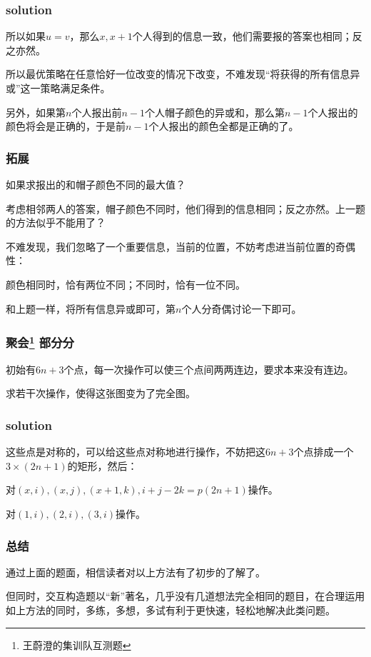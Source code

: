 \documentclass[10pt]{beamer}
\begin{document}
	\begin{frame}
		\frametitle{solution}	
		
		所以如果$u=v$，那么$x,x+1$个人得到的信息一致，他们需要报的答案也相同；反之亦然。

		所以最优策略在任意恰好一位改变的情况下改变，不难发现“将获得的所有信息异或”这一策略满足条件。

		另外，如果第$n$个人报出前$n-1$个人帽子颜色的异或和，那么第$n-1$个人报出的颜色将会是正确的，于是前$n-1$个人报出的颜色全都是正确的了。
	
	\end{frame}
	\clearpage
	\begin{frame}
		\frametitle{拓展}
	
		如果求报出的和帽子颜色不同的最大值？


		考虑相邻两人的答案，帽子颜色不同时，他们得到的信息相同；反之亦然。上一题的方法似乎不能用了？


		不难发现，我们忽略了一个重要信息，当前的位置，不妨考虑进当前位置的奇偶性：
		
		颜色相同时，恰有两位不同；不同时，恰有一位不同。

		和上题一样，将所有信息异或即可，第$n$个人分奇偶讨论一下即可。
	
	\end{frame}
	\clearpage
	\begin{frame}
		\frametitle{聚会\footnote[1]{王蔚澄的集训队互测题} 部分分}
	
		初始有$6n+3$个点，每一次操作可以使三个点间两两连边，要求本来没有连边。

		求若干次操作，使得这张图变为了完全图。
	
	\end{frame}
	\clearpage
	\begin{frame}
		\frametitle{solution}
	
		这些点是对称的，可以给这些点对称地进行操作，不妨把这$6n+3$个点排成一个$3\times(2n+1)$的矩形，然后：

		对$(x,i),(x,j),(x+1,k),i+j-2k=p(2n+1)$操作。
		
		对$(1,i),(2,i),(3,i)$操作。
	
	\end{frame}
	\clearpage
	\begin{frame}
		\frametitle{总结}
	
		通过上面的题面，相信读者对以上方法有了初步的了解了。

		但同时，交互构造题以“新”著名，几乎没有几道想法完全相同的题目，在合理运用如上方法的同时，多练，多想，多试有利于更快速，轻松地解决此类问题。
	
	\end{frame}
\end{document}
